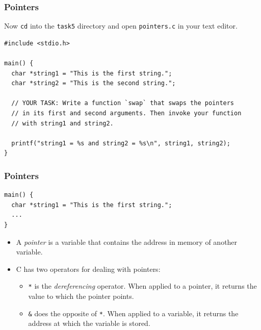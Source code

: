 \documentclass[pdf]{beamer}
\begin{document}
\begin{frame}[fragile]
  \frametitle{Pointers}

  Now \texttt{cd} into the \texttt{task5} directory and
  open \texttt{pointers.c} in your text editor.

  \pause

  \bigskip

\begin{verbatim}
#include <stdio.h>

main() {
  char *string1 = "This is the first string.";
  char *string2 = "This is the second string.";

  // YOUR TASK: Write a function `swap` that swaps the pointers
  // in its first and second arguments. Then invoke your function
  // with string1 and string2.

  printf("string1 = %s and string2 = %s\n", string1, string2);
}
\end{verbatim}

\end{frame}

\begin{frame}[fragile]
  \frametitle{Pointers}

\begin{verbatim}
main() {
  char *string1 = "This is the first string.";
  ...
}
\end{verbatim}

  \bigskip

  \begin{itemize}
  \item A \textit{pointer} is a variable that contains the address in memory of
    another variable. \pause
  \item C has two operators for dealing with pointers: \pause
    \begin{itemize}
    \item \texttt{*} is the \textit{dereferencing} operator. When applied
      to a pointer, it returns the value to which the pointer points. \pause
    \item \texttt{&} does the opposite of \texttt{*}. When applied
      to a variable, it returns the address at which the variable is stored.
    \end{itemize}
  \end{itemize}
\end{frame}
\end{document}
